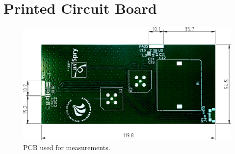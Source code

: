 \chapter{Printed Circuit Board}
\label{cha:pcb}

\begin{figure}[htbp]
    \centering
    \includegraphics[scale=0.5]{img/tech_sol/samanthas_board.pdf}
    \caption{PCB used for measurements.}
    \label{fig:samanthas_board}
\end{figure}
